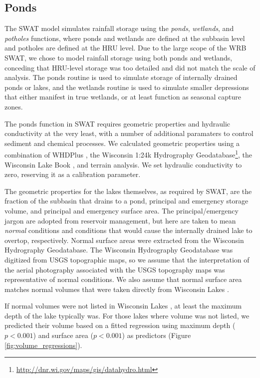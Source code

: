 \subsection{Ponds}\label{sec:ponds}
The SWAT model simulates rainfall storage using the \textit{ponds}, \textit{wetlands}, and \textit{potholes} functions, where ponds and wetlands are defined at the subbasin level and potholes are defined at the HRU level. Due to the large scope of the WRB SWAT, we chose to model rainfall storage using both ponds and wetlands, conceding that HRU-level storage was too detailed and did not match the scale of analysis. The ponds routine is used to simulate storage of internally drained ponds or lakes, and the wetlands routine is used to simulate smaller depressions that either manifest in true wetlands, or at least function as seasonal capture zones.

The ponds function in SWAT requires geometric properties and hydraulic conductivity at the very least, with a number of additional paramaters to control sediment and chemical processes. We calculated geometric properties using a combination of WHDPlus \citep{wdnr_whdplus_2013}, the Wisconsin 1:24k Hydrography Geodatabase\footnote{\url{http://dnr.wi.gov/maps/gis/datahydro.html}}, the Wisconsin Lake Book , and terrain analysis. We set hydraulic conductivity to zero, reserving it as a calibration parameter.

The geometric properties for the lakes themselves, as required by SWAT, are the fraction of the subbasin that drains to a pond, principal and emergency storage volume, and principal and emergency surface area. The principal/emergency jargon are adopted from reservoir management, but here are taken to mean \textit{normal} conditions and conditions that would cause the internally drained lake to overtop, respectively. Normal surface areas were extracted from the Wisconsin Hydrography Geodatabase. The Wisconsin Hydrography Geodatabase was digitized from USGS topographic maps, so we assume that the interpretation of the aerial photography associated with the USGS topography maps was representative of normal conditions.  We also assume that normal surface area matches normal volumes that were taken directly from Wisconsin Lakes .

If normal volumes were not listed in Wisconsin Lakes , at least the maximum depth of the lake typically was. For those lakes where volume was not listed, we predicted their volume based on a fitted regression using maximum depth ($p < 0.001$) and surface area ($p < 0.001$) as predictors (Figure \ref{fig:volume_regressions}).


